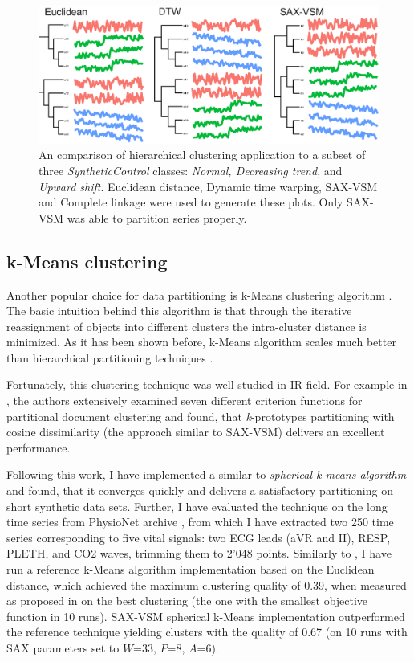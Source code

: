 \begin{figure}[!h!t]
   \centering
   \includegraphics[width=120mm]{figures/clustering.eps}
   \caption{An comparison of hierarchical clustering application to a subset of three
   \textit{SyntheticControl} classes: \textit{Normal, Decreasing trend}, and \textit{Upward shift}. 
   Euclidean distance, Dynamic time warping, SAX-VSM and Complete linkage were used to 
   generate these plots. Only SAX-VSM was able to partition series properly.                       
   }
   \label{fig:hc}
\end{figure}

\subsection{k-Means clustering}
Another popular choice for data partitioning is k-Means clustering algorithm \cite{kmeans}.
The basic intuition behind this algorithm is that through the iterative reassignment of objects 
into different clusters the intra-cluster distance is minimized. As it has been shown before, k-Means 
algorithm scales much better than hierarchical partitioning techniques \cite{citeulike:4195343}.

Fortunately, this clustering technique was well studied in IR field. For example in \cite{citeulike:505248}, the
authors extensively examined seven different criterion functions for partitional document clustering and found, 
that \textit{k}-prototypes partitioning with cosine dissimilarity (the approach similar to SAX-VSM) delivers an 
excellent performance. 

Following this work, I have implemented a similar to \cite{citeulike:1172599} \textit{spherical k-means algorithm}
and found, that it converges quickly and delivers a satisfactory partitioning on short synthetic data sets. 
Further, I have evaluated the technique on the long time series from PhysioNet archive \cite{citeulike:699487}, 
from which I have extracted two 250 time series corresponding to five vital signals: 
two ECG leads (aVR and II), RESP, PLETH, and CO2 waves, trimming them to 2'048 points. 
Similarly to \cite{citeulike:10525778}, I have run a reference k-Means algorithm implementation 
\cite{R_software} \cite{hartigan1979} based on the Euclidean distance, which achieved the maximum clustering 
quality of 0.39, when measured as proposed in \cite{citeulike:1325189} on the best clustering 
(the one with the smallest objective function in 10 runs). 
SAX-VSM spherical k-Means implementation outperformed the reference technique yielding 
clusters  with the quality of 0.67 (on 10 runs with SAX parameters set to $W$=33, $P$=8, $A$=6).


